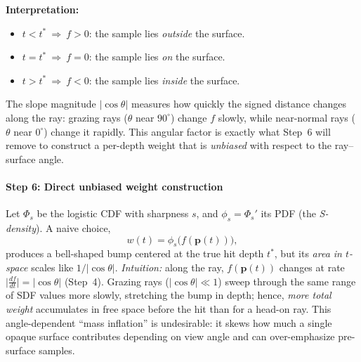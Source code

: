 \begin{enrichment}
\begin{enrichment}
        \medskip
        \noindent\textbf{Interpretation:}  
        \begin{itemize}
            \item $t < t^* \ \Rightarrow\ f > 0$: the sample lies \emph{outside} the surface.
            \item $t = t^* \ \Rightarrow\ f = 0$: the sample lies \emph{on} the surface.
            \item $t > t^* \ \Rightarrow\ f < 0$: the sample lies \emph{inside} the surface.
        \end{itemize}
        The slope magnitude $|\cos\theta|$ measures how quickly the signed distance changes along the ray: grazing rays ($\theta$ near $90^\circ$) change $f$ slowly, while near-normal rays ($\theta$ near $0^\circ$) change it rapidly.  
        This angular factor is exactly what Step~6 will remove to construct a per-depth weight that is \emph{unbiased} with respect to the ray–surface angle.
        
        \paragraph{Step 6: Direct unbiased weight construction}
        Let $\Phi_s$ be the logistic CDF with sharpness $s$, and $\phi_s = \Phi_s'$ its PDF (the \emph{S-density}).  
        A naive choice,
        \begin{equation}
            w(t)=\phi_s\big(f(\mathbf{p}(t))\big),
        \end{equation}
        produces a bell-shaped bump centered at the true hit depth $t^*$, but its \emph{area in $t$-space} scales like $1/|\cos\theta|$.  
        \emph{Intuition:} along the ray, $f(\mathbf{p}(t))$ changes at rate $\big|\tfrac{df}{dt}\big| = |\cos\theta|$ (Step~4).  
        Grazing rays ($|\cos\theta|\!\ll\!1$) sweep through the same range of SDF values more slowly, stretching the bump in depth; hence, \emph{more total weight} accumulates in free space before the hit than for a head-on ray.  
        This angle-dependent ``mass inflation'' is undesirable: it skews how much a single opaque surface contributes depending on view angle and can over-emphasize pre-surface samples.
        

\end{enrichment}
\end{enrichment}
